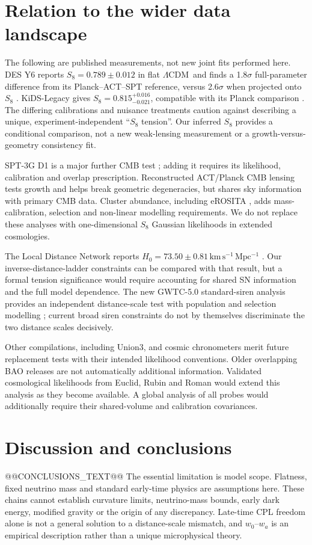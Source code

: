 \documentclass[fleqn,usenatbib]{mnras}
\newcommand{\lcdm}{$\Lambda$CDM}
\newcommand{\hunit}{\mathrm{km\,s^{-1}\,Mpc^{-1}}}
\begin{document}
\section{Relation to the wider data landscape}\label{sec:context}
The following are published measurements, not new joint fits performed here.
DES Y6 reports $S_8=0.789\pm0.012$ in flat \lcdm\ and finds a 1.8$\sigma$
full-parameter difference from its Planck--ACT--SPT reference, versus
2.6$\sigma$ when projected onto $S_8$ \citep{DESY6}. KiDS-Legacy gives
$S_8=0.815^{+0.016}_{-0.021}$, compatible with its Planck comparison
\citep{KiDS}. The differing calibrations and nuisance treatments caution
against describing a unique, experiment-independent ``$S_8$ tension''.
Our inferred $S_8$ provides a conditional comparison, not a new weak-lensing
measurement or a growth-versus-geometry consistency fit.

SPT-3G D1 is a major further CMB test \citep{SPT}; adding it requires its
likelihood, calibration and overlap prescription. Reconstructed ACT/Planck
CMB lensing \citep{Lensing} tests growth and helps break geometric degeneracies,
but shares sky information with primary CMB data. Cluster abundance, including
eROSITA \citep{eROSITA}, adds mass-calibration, selection and non-linear
modelling requirements. We do not replace these analyses with one-dimensional
$S_8$ Gaussian likelihoods in extended cosmologies.

The Local Distance Network reports
$H_0=73.50\pm0.81\,\hunit$ \citep{DistanceNetwork}. Our inverse-distance-ladder
constraints can be compared with that result, but a formal tension significance
would require accounting for shared SN information and the full model
dependence. The new GWTC-5.0 standard-siren analysis provides an independent
distance-scale test with population and selection modelling
\citep{GWTC5}; current broad siren constraints do not by themselves discriminate
the two distance scales decisively.

Other compilations, including Union3, and cosmic chronometers merit future
replacement tests with their intended likelihood conventions. Older overlapping
BAO releases are not automatically additional information. Validated cosmological likelihoods from Euclid, Rubin and Roman would extend
this analysis as they become available. A global analysis of all probes would additionally require their
shared-volume and calibration covariances.

\section{Discussion and conclusions}
@@CONCLUSIONS_TEXT@@
The essential limitation is model scope. Flatness, fixed neutrino mass and
standard early-time physics are assumptions here. These chains cannot establish
curvature limits, neutrino-mass bounds, early dark energy, modified gravity or
the origin of any discrepancy. Late-time CPL freedom alone is not a general
solution to a distance-scale mismatch, and $w_0$--$w_a$ is an empirical
description rather than a unique microphysical theory.
\end{document}
